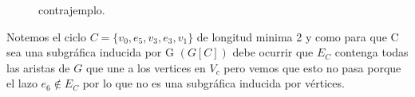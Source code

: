 \begin{enumerate}
\begin{figure}[!hbt]
\begin{center}
              \end{center}
              \caption{contrajemplo.}
          \end{figure}

          Notemos el ciclo $C=\{v_0,e_5,v_3,e_3,v_1\}$ de longitud minima 2 y como para que C sea una subgráfica inducida por G $(G\left[C\right])$ debe ocurrir que $E_C$ contenga todas las aristas de $G$ que une a los vertices en $V_c$ pero vemos que esto no pasa porque el lazo $e_6\notin E_C$ por lo que no es una subgráfica inducida por vértices.
\end{enumerate}